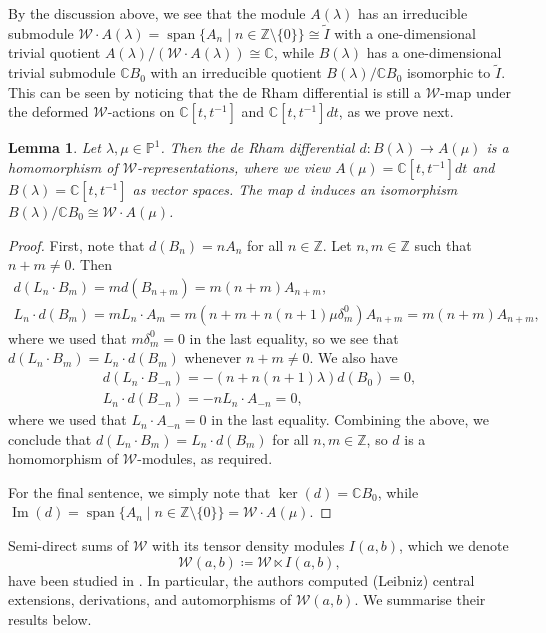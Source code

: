 \documentclass[11pt, svgnames]{amsart}
\DeclareMathOperator{\spn}{span}
\DeclareMathOperator{\im}{Im}
\newcommand{\ZZ}{\mathbb{Z}}
\newcommand{\CC}{\mathbb{C}}
\newcommand{\PP}{\mathbb{P}}
\newcommand{\W}{\mathcal{W}}
\newcommand{\nonzero}{\setminus \{0\}}
\newtheorem{lemma}[proposition]{Lemma}
\theoremstyle{definition}
\begin{document}
By the discussion above, we see that the module $A(\lambda)$ has an irreducible submodule $\W \cdot A(\lambda) = \spn\{A_n \mid n \in \ZZ \nonzero\} \cong \widetilde{I}$ with a one-dimensional trivial quotient $A(\lambda)/(\W \cdot A(\lambda)) \cong \CC$, while $B(\lambda)$ has a one-dimensional trivial submodule $\CC B_0$ with an irreducible quotient $B(\lambda)/\CC B_0$ isomorphic to $\widetilde{I}$. This can be seen by noticing that the de Rham differential is still a $\W$-map under the deformed $\W$-actions on $\CC[t,t^{-1}]$ and $\CC[t,t^{-1}]dt$, as we prove next.

\begin{lemma}
    Let $\lambda, \mu \in \PP^1$. Then the de Rham differential $d \colon B(\lambda) \to A(\mu)$ is a homomorphism of $\W$-representations, where we view $A(\mu) = \CC[t,t^{-1}]dt$ and $B(\lambda) = \CC[t,t^{-1}]$ as vector spaces. The map $d$ induces an isomorphism $B(\lambda)/\CC B_0 \cong \W \cdot A(\mu)$.
\end{lemma}
\begin{proof}
    First, note that $d(B_n) = nA_n$ for all $n \in \ZZ$. Let $n,m \in \ZZ$ such that $n + m \neq 0$. Then
    $$\begin{gathered}
        d(L_n \cdot B_m) = md(B_{n+m}) = m(n + m)A_{n+m}, \\
        L_n \cdot d(B_m) = m L_n \cdot A_m = m(n + m + n(n + 1)\mu\delta_m^0)A_{n+m} = m(n + m)A_{n+m},
    \end{gathered}$$
    where we used that $m\delta_m^0 = 0$ in the last equality, so we see that $d(L_n \cdot B_m) = L_n \cdot d(B_m)$ whenever $n + m \neq 0$. We also have
    $$\begin{gathered}
        d(L_n \cdot B_{-n}) = -(n + n(n + 1)\lambda)d(B_0) = 0, \\
        L_n \cdot d(B_{-n}) = -n L_n \cdot A_{-n} = 0,
    \end{gathered}$$
    where we used that $L_n \cdot A_{-n} = 0$ in the last equality. Combining the above, we conclude that $d(L_n \cdot B_m) = L_n \cdot d(B_m)$ for all $n,m \in \ZZ$, so $d$ is a homomorphism of $\W$-modules, as required.

    For the final sentence, we simply note that $\ker(d) = \CC B_0$, while $\im(d) = \spn\{A_n \mid n \in \ZZ \nonzero\} = \W \cdot A(\mu)$.
\end{proof}

Semi-direct sums of $\W$ with its tensor density modules $I(a,b)$, which we denote
$$\W(a,b) \coloneqq \W \ltimes I(a,b),$$
have been studied in \cite{GaoJiangPei}. In particular, the authors computed (Leibniz) central extensions, derivations, and automorphisms of $\W(a,b)$. We summarise their results below.
\end{document}

